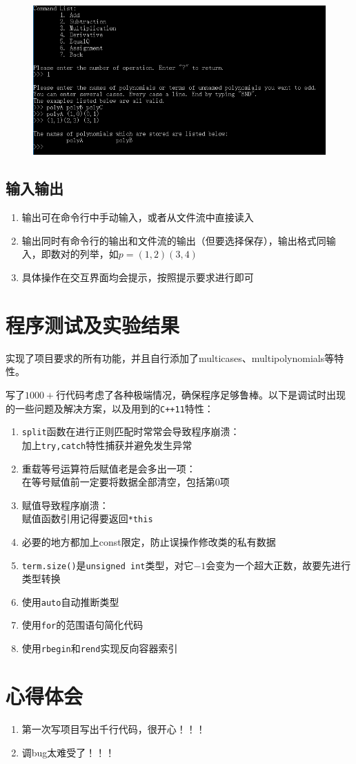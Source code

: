 \documentclass[11pt,UTF8]{ctexart}
\begin{document}
\begin{figure}[H]
\centering
\includegraphics[width=\linewidth]{pic/add2.PNG}
\label{Fig:add2}
\end{figure}

\subsection{输入输出}
\begin{enumerate}
	\item 输出可在命令行中手动输入，或者从文件流中直接读入
	\item 输出同时有命令行的输出和文件流的输出（但要选择保存），输出格式同输入，即数对的列举，如$p=(1,2)(3,4)$
	\item 具体操作在交互界面均会提示，按照提示要求进行即可
\end{enumerate}


\section{程序测试及实验结果}
\par 实现了项目要求的所有功能，并且自行添加了multicases、multipolynomials等特性。
\par 写了$1000+$行代码考虑了各种极端情况，确保程序足够鲁棒。以下是调试时出现的一些问题及解决方案，以及用到的\verb'C++11'特性：
\begin{enumerate}
	\item \verb'split'函数在进行正则匹配时常常会导致程序崩溃：\\
		加上\verb'try,catch'特性捕获并避免发生异常
	\item 重载等号运算符后赋值老是会多出一项：\\
	在等号赋值前一定要将数据全部清空，包括第$0$项
	\item 赋值导致程序崩溃：\\
	赋值函数引用记得要返回\verb'*this'
	\item 必要的地方都加上const限定，防止误操作修改类的私有数据
	\item \verb'term.size()'是\verb'unsigned int'类型，对它$-1$会变为一个超大正数，故要先进行类型转换
	\item 使用\verb'auto'自动推断类型
	\item 使用\verb'for'的范围语句简化代码
	\item 使用\verb'rbegin'和\verb'rend'实现反向容器索引
\end{enumerate}


\section{心得体会}
\begin{enumerate}
	\item 第一次写项目写出千行代码，很开心！！！
	\item 调bug太难受了！！！
\end{enumerate}
\end{document}
